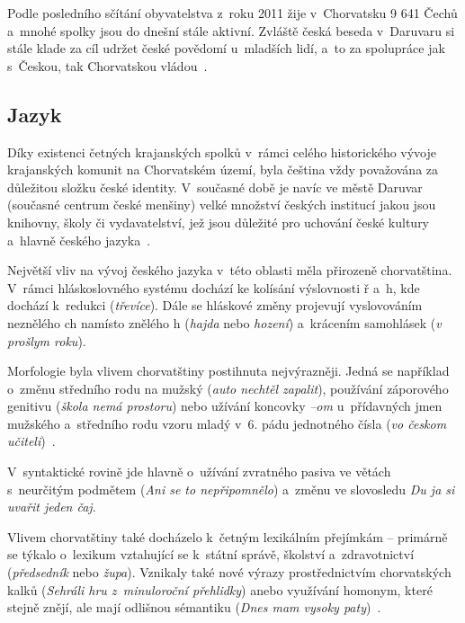 Podle posledního sčítání obyvatelstva z~roku 2011 žije v~Chorvatsku 9 641 Čechů a~mnohé spolky jsou do dnešní stále aktivní. Zvláště česká beseda v~Daruvaru si stále klade za cíl udržet české povědomí u~mladších lidí, a~to za spolupráce jak s~Českou, tak Chorvatskou vládou~\parencite{Kokaisl2012}.

\hypertarget{jazyk-3}{%
\subsection*{Jazyk}\label{jazyk-3}}

Díky existenci četných krajanských spolků v~rámci celého historického vývoje krajanských komunit na Chorvatském území, byla čeština vždy považována za důležitou složku české identity. V~současné době je navíc ve městě Daruvar (současné centrum české menšiny) velké množství českých institucí jakou jsou knihovny, školy či vydavatelství, jež jsou důležité pro uchování české kultury a~hlavně českého jazyka~\parencite{Veltruski2018}.

Největší vliv na vývoj českého jazyka v~této oblasti měla přirozeně chorvatština. V~rámci hláskoslovného systému dochází ke kolísání výslovnosti ř a~h, kde dochází k~redukci (\emph{třevíce}). Dále se hláskové změny projevují vyslovováním neznělého ch namísto znělého h (\emph{hajda} nebo \emph{hození}) a~krácením samohlásek (\emph{v prošlym roku}).

Morfologie byla vlivem chorvatštiny postihnuta nejvýrazněji. Jedná se například o~změnu středního rodu na mužský (\emph{auto nechtěl zapalit}), používání záporového genitivu (\emph{škola nemá prostoru}) nebo užívání koncovky \emph{--om} u~přídavných jmen mužského a~středního rodu vzoru mladý v~6. pádu jednotného čísla (\emph{vo českom učiteli})~\parencite{Kokaisl2012}.

V~syntaktické rovině jde hlavně o~užívání zvratného pasiva ve větách s~neurčitým podmětem (\emph{Ani se to nepřipomnělo}) a~změnu ve slovosledu \emph{Du ja si uvařit jeden čaj}.

Vlivem chorvatštiny také docházelo k~četným lexikálním přejímkám -- primárně se týkalo o~lexikum vztahující se k~státní správě, školství a~zdravotnictví (\emph{předsedník} nebo \emph{župa}). Vznikaly také nové výrazy prostřednictvím chorvatských kalků (\emph{Sehráli hru z~minuloroční přehlidky}) anebo využívání homonym, které stejně znějí, ale mají odlišnou sémantiku (\emph{Dnes mam vysoky paty})~\parencite{Kokaisl2012}.
